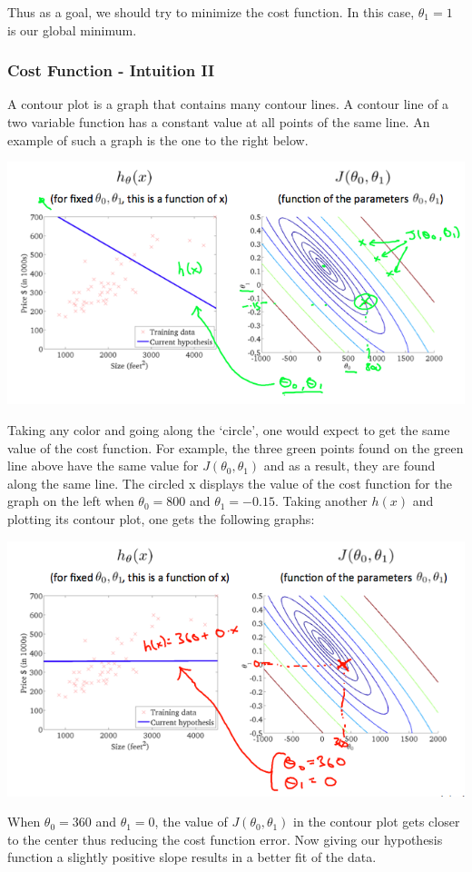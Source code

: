 \documentclass[UTF8]{article}
\begin{document}
Thus as a goal, we should try to minimize the cost function. In this case, $\theta_1=1$ is our global minimum.

\subsubsection{Cost Function - Intuition II}

A contour plot is a graph that contains many contour lines. A contour line of a two variable function has a constant value at all points of the same line. An example of such a graph is the one to the right below.

\includegraphics[width = .8\textwidth]{NotePics/2_2_2_1.png}

Taking any color and going along the `circle', one would expect to get the same value of the cost function. For example, the three green points found on the green line above have the same value for $J(\theta_0,\theta_1)$ and as a result, they are found along the same line. The circled x displays the value of the cost function for the graph on the left when $\theta_0 = 800$ and $\theta_1= -0.15$. Taking another $h(x)$ and plotting its contour plot, one gets the following graphs:

\includegraphics[width = .8\textwidth]{NotePics/2_2_2_2.png}

When $\theta_0 = 360$ and $\theta_1 = 0$, the value of $J(\theta_0,\theta_1)$ in the contour plot gets closer to the center thus reducing the cost function error. Now giving our hypothesis function a slightly positive slope results in a better fit of the data.
\end{document}
